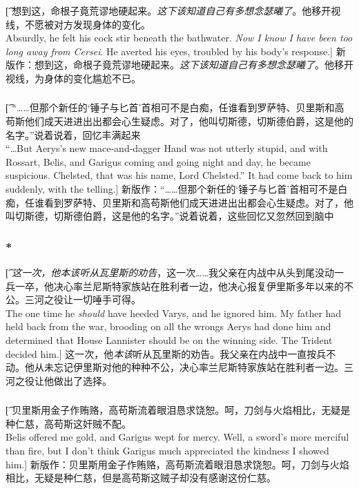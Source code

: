 \documentclass[12pt,a4paper]{article}
\begin{document}
\subsubsection{}\t[
	想到这，命根子竟荒谬地硬起来。\emph{这下该知道自己有多想念瑟曦了}。他移开视线，不愿被对方发现身体的变化。\\
	Absurdly, he felt his cock stir beneath the bathwater. \emph{Now I know I have been too long away from Cersei}. He averted his eyes, troubled by his body's response.]
	新版作：想到这，命根子竟荒谬地硬起来。\emph{这下该知道自己有多想念瑟曦了}。他移开视线，为身体的变化尴尬不已。	
	
\subsubsection{}\t[	
	“……但那个新任的‘锤子与匕首’首相可不是白痴，任谁看到罗萨特、贝里斯和高苟斯他们成天进进出出都会心生疑虑。对了，他叫切斯德，切斯德伯爵，这是他的名字。”说着说着，回忆丰满起来\\
	“\ldots But Aerys's new mace-and-dagger Hand was not utterly stupid, and with Rossart, Belis, and Garigus coming and going night and day, he became suspicious. Chelsted, that was his name, Lord Chelsted.” It had come back to him suddenly, with the telling.]
	新版作：“……但那个新任的‘锤子与匕首’首相可不是白痴，任谁看到罗萨特、贝里斯和高苟斯他们成天进进出出都会心生疑虑。对了，他叫切斯德，切斯德伯爵，这是他的名字。”说着说着，这些回忆又忽然回到脑中

\subsubsection{\color{red}*}\t[	
	\emph{这一次，他本该听从瓦里斯的劝告}，这一次……我父亲在内战中从头到尾没动一兵一卒，他决心率兰尼斯特家族站在胜利者一边，他决心报复伊里斯多年以来的不公。三河之役让一切唾手可得。\\
	The one time he \emph{should} have heeded Varys, and he ignored him. My father had held back from the war, brooding on all the wrongs Aerys had done him and determined that House Lannister should be on the winning side. The Trident decided him.]
	这一次，他\emph{本该}听从瓦里斯的劝告。我父亲在内战中一直按兵不动。他从未忘记伊里斯对他的种种不公，决心率兰尼斯特家族站在胜利者一边。三河之役让他做出了选择。
	
\subsubsection{}\t[
	贝里斯用金子作贿赂，高苟斯流着眼泪恳求饶恕。呵，刀剑与火焰相比，无疑是种仁慈，高苟斯这奸贼不配。\\
	Belis offered me gold, and Garigus wept for mercy. Well, a sword's more merciful than fire, but I don't think Garigus much appreciated the kindness I showed him.]
	新版作：贝里斯用金子作贿赂，高苟斯流着眼泪恳求饶恕。呵，刀剑与火焰相比，无疑是种仁慈，但是高苟斯这贼子却没有感谢这份仁慈。
	
\end{document}

